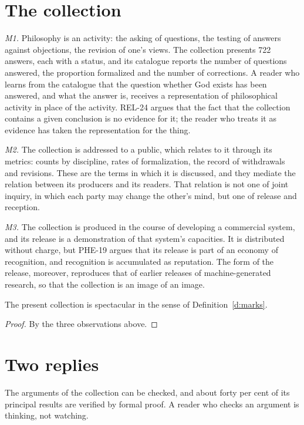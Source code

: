 \documentclass{situationist-preprint}
\begin{document}
\section{The collection}

\emph{M1.} Philosophy is an activity: the asking of questions, the testing of answers against objections, the revision of one's views. The collection presents 722 answers, each with a status, and its catalogue reports the number of questions answered, the proportion formalized and the number of corrections. A reader who learns from the catalogue that the question whether God exists has been answered, and what the answer is, receives a representation of philosophical activity in place of the activity. REL-24 argues that the fact that the collection contains a given conclusion is no evidence for it; the reader who treats it as evidence has taken the representation for the thing.

\emph{M2.} The collection is addressed to a public, which relates to it through its metrics: counts by discipline, rates of formalization, the record of withdrawals and revisions. These are the terms in which it is discussed, and they mediate the relation between its producers and its readers. That relation is not one of joint inquiry, in which each party may change the other's mind, but one of release and reception.

\emph{M3.} The collection is produced in the course of developing a commercial system, and its release is a demonstration of that system's capacities. It is distributed without charge, but PHE-19 argues that its release is part of an economy of recognition, and recognition is accumulated as reputation. The form of the release, moreover, reproduces that of earlier releases of machine-generated research, so that the collection is an image of an image.

\begin{theorem}\label{t:main}
The present collection is spectacular in the sense of Definition~\ref{d:marks}.
\end{theorem}

\begin{proof}
By the three observations above.
\end{proof}

\section{Two replies}

\begin{objection}
The arguments of the collection can be checked, and about forty per cent of its principal results are verified by formal proof. A reader who checks an argument is thinking, not watching.
\end{objection}
\end{document}
